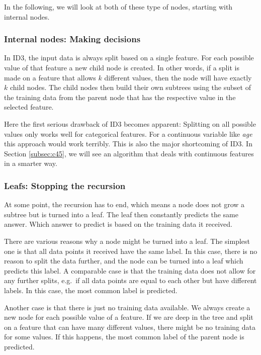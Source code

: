 \documentclass[a4paper]{article}
\begin{document}
In the following, we will look at both of these type of nodes, starting with internal nodes.

\subsubsection{Internal nodes: Making decisions}

In ID3, the input data is always split based on a single feature. For each possible value of that feature a new child node is created.
In other words, if a split is made on a feature that allows $k$ different values, then the node will have exactly $k$ child nodes.
The child nodes then build their own subtrees using the subset of the training data from the parent node that has the respective value in the selected feature.

Here the first serious drawback of ID3 becomes apparent: Splitting on all possible values only works well for categorical features. For a continuous variable like \emph{age} this approach would work terribly. This is also the major shortcoming of ID3. In Section \ref{subsec:c45}, we will see an algorithm that deals with continuous features in a smarter way.

\subsubsection{Leafs: Stopping the recursion}

At some point, the recursion has to end, which means a node does not grow a subtree but is turned into a leaf. The leaf then constantly predicts the same answer. Which answer to predict is based on the training data it received.

There are various reasons why a node might be turned into a leaf. The simplest one is that all data points it received have the same label. In this case, there is no reason to split the data further, and the node can be turned into a leaf which predicts this label. A comparable case is that the training data does not allow for any further splits, e.g.\ if all data points are equal to each other but have different labels. In this case, the most common label is predicted.

Another case is that there is just no training data available. We always create a new node for each possible value of a feature. If we are deep in the tree and split on a feature that can have many different values, there might be no training data for some values. If this happens, the most common label of the parent node is predicted.
\end{document}
